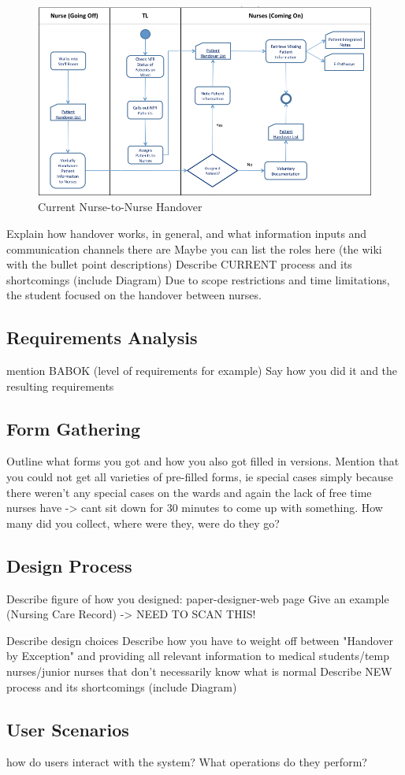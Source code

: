 \begin{figure}[hp]
				\centering
				\includegraphics[angle=-90,scale=1.0, width=120mm]{Images/Nurse-to-Nurse-Handover-Process-As-Is}
				\caption{Current Nurse-to-Nurse Handover}
\end{figure} 

\newpage
Explain how handover works, in general, and what information inputs and communication channels there are
Maybe you can list the roles here (the wiki with the bullet point descriptions)
Describe CURRENT process and its shortcomings (include Diagram)
Due to scope restrictions and time limitations, the student focused on the handover between nurses. 
\subsection{Requirements Analysis}
mention BABOK (level of requirements for example)
Say how you did it and the resulting requirements

\subsection{Form Gathering}
Outline what forms you got and how you also got filled in versions. Mention that you could not get all varieties of pre-filled forms, ie special cases simply because there weren't any special cases on the wards and again the lack of free time nurses have -> cant sit down for 30 minutes to come up with something. 
How many did you collect, where were they, were do they go?

\subsection{Design Process}
Describe figure of how you designed: paper-designer-web page
Give an example (Nursing Care Record) -> NEED TO SCAN THIS!

Describe design choices
Describe how you have to weight off between "Handover by Exception" and providing all relevant information to medical students/temp nurses/junior nurses that don't necessarily know what is normal
Describe NEW process and its shortcomings (include Diagram)

\subsection{User Scenarios}
how do users interact with the system? What operations do they perform?

